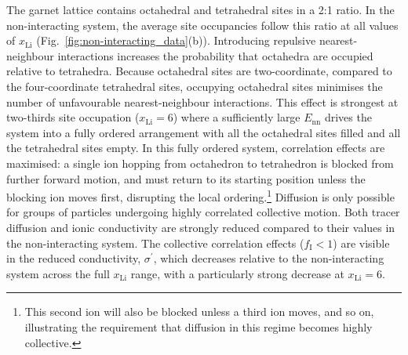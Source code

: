 \documentclass[aps,prb,twocolumn,superscriptaddress,reprint]{revtex4-1}
\newcommand{\xLi}{x_\m{Li}}
\newcommand{\m}[1]{\mathrm{#1}}
\begin{document}
The garnet lattice contains octahedral and tetrahedral sites in a 2:1 ratio. In the non-interacting system, the average site occupancies follow this ratio at all values of $\xLi$ (Fig.~\ref{fig:non-interacting_data}(b)). Introducing repulsive nearest-neighbour interactions increases the probability that octahedra are occupied relative to tetrahedra. Because octahedral sites are two-coordinate, compared to the four-coordinate tetrahedral sites, occupying octahedral sites minimises the number of unfavourable nearest-neighbour interactions. This effect is strongest at two-thirds site occupation ($\xLi=6$) where a sufficiently large $E_\m{nn}$ drives the system into a fully ordered arrangement with all the octahedral sites filled and all the tetrahedral sites empty. 
In this fully ordered system, correlation effects are maximised: a single ion hopping from octahedron to tetrahedron is blocked from further forward motion, and must return to its starting position unless the blocking ion moves first, disrupting the local ordering.\footnote{This second ion will also be blocked unless a third ion moves, and so on, illustrating the requirement that diffusion in this regime becomes highly collective.} Diffusion is only possible for groups of particles undergoing highly correlated collective motion.\cite{MorganAndMadden_PhysRevLett2014,BurbanoEtAl_PhysRevLett2016} Both tracer diffusion and ionic conductivity are strongly reduced compared to their values in the non-interacting system. The collective correlation effects ($f_\m{I}<1$) are visible in the reduced conductivity, $\sigma^\prime$, which decreases relative to the non-interacting system across the full $\xLi$ range, with a particularly strong decrease at $\xLi=6$.
\end{document}

